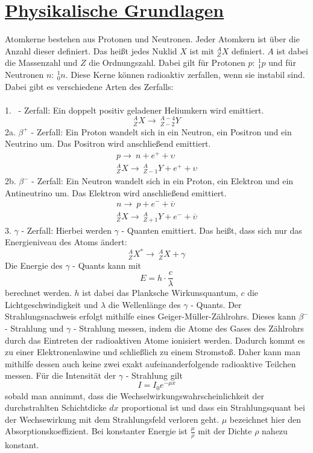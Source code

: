 \documentclass[11pt,a4paper]{article}
\begin{document}
\section{\underline{Physikalische Grundlagen}}
Atomkerne bestehen aus Protonen und Neutronen. Jeder Atomkern ist über die Anzahl
dieser definiert. Das heißt jedes Nuklid $X$ ist mit $^A_Z{X}$ definiert. $A$ ist dabei
die Massenzahl und $Z$ die Ordnungszahl. Dabei gilt für Protonen $p:~^1_1p$ und für
Neutronen $n:~^1_0n$. Diese Kerne können radioaktiv zerfallen, wenn sie instabil
sind. Dabei gibt es verschiedene Arten des Zerfalls:
\\\\
1. \alpha~- Zerfall: Ein doppelt positiv geladener Heliumkern wird emittiert.
\begin{equation}
    ^A_Z{X} \rightarrow~^{A-4}_{Z-2}Y
\end{equation}
2a. $\beta ^+$ - Zerfall: Ein Proton wandelt sich in ein Neutron, ein Positron und ein
Neutrino um. Das Positron wird anschließend emittiert.
\begin{align}
  p \rightarrow~n + e^+ + \upsilon \\
    ^A_ZX \rightarrow~{^A_{Z-1}Y} + e^+ + \upsilon
\end{align}
2b. $\beta ^-$ - Zerfall: Ein Neutron wandelt sich in ein Proton, ein Elektron und ein
Antineutrino um. Das Elektron wird anschließend emittiert.
\begin{align}
  n \rightarrow~p + e^- + \overline{\upsilon} \\
    ^A_ZX \rightarrow~{^A_{Z+1}Y} + e^- + \overline{\upsilon}
\end{align}
3. $\gamma$ - Zerfall: Hierbei werden $\gamma$ - Quanten emittiert. Das heißt, dass sich nur das Energieniveau des Atoms ändert:
\begin{equation}
    ^A_ZX^* \rightarrow~{^A_ZX} + \gamma
\end{equation}
Die Energie des $\gamma$ - Quants kann mit
\begin{equation}
  E = h \cdot \frac{c}{\lambda}
\end{equation}
berechnet werden. $h$ ist dabei das Planksche Wirkunsquantum, $c$ die
Lichtgeschwindigkeit und $\lambda$ die Wellenlänge des $\gamma$ - Quants.
Der Strahlungsnachweis erfolgt mithilfe eines Geiger-Müller-Zählrohrs. Dieses kann
$\beta^-$ - Strahlung und $\gamma$ - Strahlung messen, indem die Atome des Gases des
Zählrohrs durch das Eintreten der radioaktiven Atome ionisiert werden. Dadurch kommt
es zu einer Elektronenlawine und schließlich zu einem Stromstoß. Daher kann man
mithilfe dessen auch keine zwei exakt aufeinanderfolgende radioaktive Teilchen messen.
Für die Intensität der $\gamma$ - Strahlung gilt
\begin{equation}
  I = I_0e^{- \mu x}
\end{equation}
sobald man annimmt, dass die Wechselwirkungswahrscheinlichkeit der durchstrahlten
Schichtdicke $dx$ proportional ist und dass ein Strahlungsquant bei der Wechsewirkung
mit dem Strahlungsfeld verloren geht. $\mu$ bezeichnet hier den
Absorptionskoeffizient. Bei konstanter Energie ist $\frac{\mu}{\rho}$ mit der Dichte
$\rho$ nahezu konstant.
\end{document}
